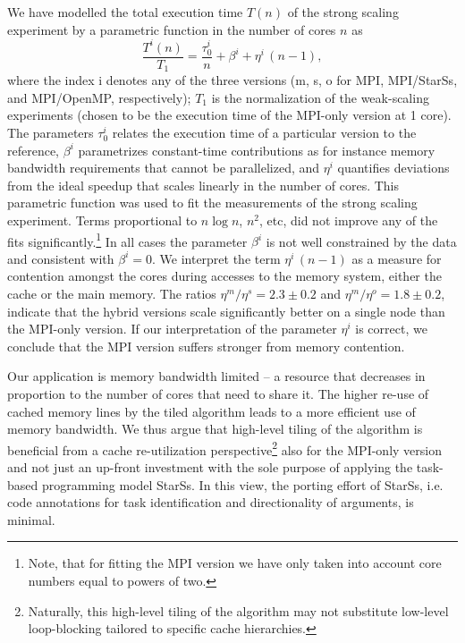 \documentclass[conference]{IEEEtran}
\newcommand{\starss}{{StarSs}}
\begin{document}
We have modelled the total execution time $T(n)$  of the strong
scaling experiment by a parametric function in the number of cores $n$
as
\begin{equation}
\label{eq:tstrong}
  \frac{T^i(n)}{T_1} = \frac{\tau^i_0}{n} + \beta^i + \eta^i \, (n-1),
\end{equation}
where the index i denotes any of the three versions (m, s, o for MPI,
MPI/StarSs, and MPI/OpenMP, respectively); $T_1$ is the normalization
of the weak-scaling experiments (chosen to be the execution time of
the MPI-only version at 1 core). The parameters $\tau^i_0$ relates the
execution time of a particular version to the reference, $\beta^i$
parametrizes constant-time contributions as for instance memory
bandwidth requirements that cannot be parallelized, and $\eta^i$
quantifies deviations from the ideal speedup that scales linearly in the
number of cores. This parametric function was used to fit the
measurements of the strong scaling experiment. Terms proportional to 
$n \log n$, $n^2$, etc, did not improve any of the fits
significantly.\footnote{Note, that for fitting the MPI version we have
  only taken into account core numbers equal to powers of two.}  In
all cases the parameter $\beta^i$ is not well constrained by the data
and consistent with $\beta^i=0$. We interpret the term $\eta^i \,
(n-1)$ as a measure for contention amongst the cores during accesses to
the memory system, either the cache or the main memory. The ratios
$\eta^m/\eta^s = 2.3 \pm 0.2$ and $\eta^m/\eta^o = 1.8 \pm 0.2$,
indicate that the hybrid versions scale significantly better on a
single node than the MPI-only version. If our interpretation of the
parameter $\eta^i$ is correct, we conclude that the MPI version
suffers stronger from memory contention.

Our application is memory bandwidth limited -- a
resource that decreases in proportion to the number of cores that need
to share it. The higher re-use of cached memory lines by the tiled
algorithm leads to a more efficient use of memory bandwidth.  We thus
argue that high-level tiling of the algorithm is beneficial from a
cache re-utilization perspective\footnote{Naturally, this high-level
  tiling of the algorithm may not substitute low-level loop-blocking
  tailored to specific cache hierarchies.} also for the MPI-only
version and not just an up-front investment with the sole purpose of
applying the task-based programming model \starss{}. In this view, the
porting effort of \starss{}, i.e. code annotations for task
identification and directionality of arguments, is minimal. 
\end{document}
